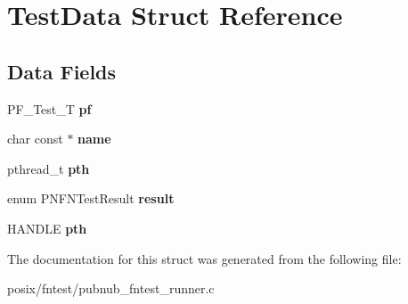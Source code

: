 \hypertarget{structTestData}{\section{Test\-Data Struct Reference}
\label{structTestData}
}
\subsection*{Data Fields}
\begin{DoxyCompactItemize}
\item 
\hypertarget{structTestData_abf01aa10294586ef043757229cf9b58d}{P\-F\-\_\-\-Test\-\_\-\-T {\bfseries pf}}\label{structTestData_abf01aa10294586ef043757229cf9b58d}

\item 
\hypertarget{structTestData_a468fb80848585876b9f36f31be342e6e}{char const $\ast$ {\bfseries name}}\label{structTestData_a468fb80848585876b9f36f31be342e6e}

\item 
\hypertarget{structTestData_ae30ebe9995b181457e3eeb1a207816c0}{pthread\-\_\-t {\bfseries pth}}\label{structTestData_ae30ebe9995b181457e3eeb1a207816c0}

\item 
\hypertarget{structTestData_aef2a79f1b5efb3252d110c1f46629321}{enum P\-N\-F\-N\-Test\-Result {\bfseries result}}\label{structTestData_aef2a79f1b5efb3252d110c1f46629321}

\item 
\hypertarget{structTestData_ae9d1544d4711b9ba5dc3c85629e4c4fd}{H\-A\-N\-D\-L\-E {\bfseries pth}}\label{structTestData_ae9d1544d4711b9ba5dc3c85629e4c4fd}

\end{DoxyCompactItemize}


The documentation for this struct was generated from the following file\-:\begin{DoxyCompactItemize}
\item 
posix/fntest/pubnub\-\_\-fntest\-\_\-runner.\-c\end{DoxyCompactItemize}
